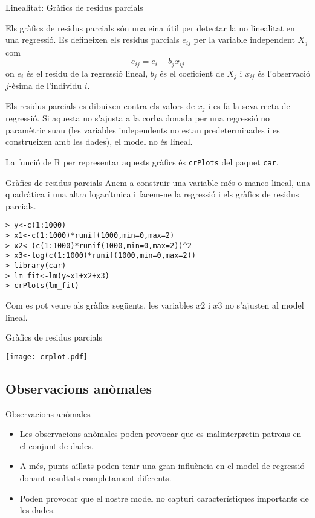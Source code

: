\documentclass[12pt,t]{beamer}
\renewcommand{\emph}[1]{{\color{red}#1}}
\theoremstyle{plain}
\theoremstyle{definition}
\begin{document}
\begin{frame}{Linealitat: Gràfics de residus parcials}

Els gràfics de residus parcials són una eina útil per detectar la no linealitat en una regressió. Es defineixen els \emph{residus parcials} $e_{ij}$ per la variable independent $X_j$ com
$$e_{ij}=e_i+b_jx_{ij}$$
on $e_i$ és el residu de la regressió lineal, $b_j$ és el coeficient de $X_j$ i $x_{ij}$ és l'observació $j$-èsima de l'individu $i$. 

\vspace{0.25cm}

Els residus parcials es dibuixen contra els valors de $x_j$ i es fa la seva recta de regressió. Si aquesta no s'ajusta a la corba donada per una regressió no paramètric suau (les variables independents no estan predeterminades i es construeixen amb les dades), el model no és lineal. 

\medskip

La funció de R per representar aquests gràfics és \texttt{crPlots} del paquet \texttt{car}.

\end{frame}

\begin{frame}[fragile]{Gràfics de residus parcials}
Anem a construir una variable més o manco lineal, una quadràtica i una altra logarítmica i facem-ne la regressió i els gràfics de residus parcials.

\begin{verbatim}
> y<-c(1:1000)
> x1<-c(1:1000)*runif(1000,min=0,max=2)
> x2<-(c(1:1000)*runif(1000,min=0,max=2))^2
> x3<-log(c(1:1000)*runif(1000,min=0,max=2))
> library(car)
> lm_fit<-lm(y~x1+x2+x3)
> crPlots(lm_fit)
\end{verbatim}

Com es pot veure als gràfics següents, les variables $x2$ i $x3$ no s'ajusten al model lineal. 

\end{frame}

\begin{frame}[fragile]{Gràfics de residus parcials}
\begin{center}
\texttt{[image: crplot.pdf]}
\end{center}
\end{frame}

\subsection{Observacions anòmales}
\begin{frame}{Observacions anòmales}
\begin{itemize}
\item Les observacions anòmales poden provocar que es malinterpretin patrons en el conjunt de dades.
\item A més, punts aïllats poden tenir una gran influència en el model de regressió donant resultats completament diferents.
\item Poden provocar que el nostre model no capturi característiques importants de les dades.
\end{itemize}
\end{frame}
\end{document}

